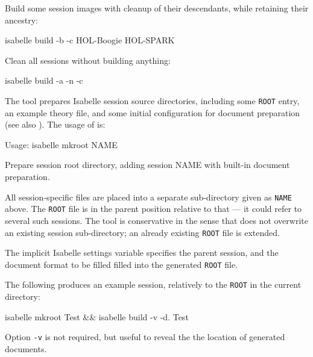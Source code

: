 \begin{isabellebody}
\begin{isamarkuptext}
  \smallskip Build some session images with cleanup of their
  descendants, while retaining their ancestry:
\begin{ttbox}
isabelle build -b -c HOL-Boogie HOL-SPARK
\end{ttbox}

  \smallskip Clean all sessions without building anything:
\begin{ttbox}
isabelle build -a -n -c
\end{ttbox}%
\end{isamarkuptext}%
\isamarkuptrue%
%
\isamarkuptrue%
%
\begin{isamarkuptext}%
The \hypertarget{tool.mkroot}{\hyperlink{tool.mkroot}{\mbox{}}} tool prepares Isabelle session source
  directories, including some \verb|ROOT| entry, an example
  theory file, and some initial configuration for document preparation
  (see also ).  The usage of \hyperlink{tool.mkroot}{\mbox{}} is:

\begin{ttbox}
Usage: isabelle mkroot NAME

  Prepare session root directory, adding session NAME with
  built-in document preparation.
\end{ttbox}

  All session-specific files are placed into a separate sub-directory
  given as \verb|NAME| above.  The \verb|ROOT| file is in
  the parent position relative to that --- it could refer to several
  such sessions.  The \hyperlink{tool.mkroot}{\mbox{}} tool is conservative in the sense
  that does not overwrite an existing session sub-directory; an
  already existing \verb|ROOT| file is extended.

  The implicit Isabelle settings variable \hyperlink{setting.ISABELLE-LOGIC}{\mbox{}}
  specifies the parent session, and \hyperlink{setting.ISABELLE-DOCUMENT-FORMAT}{\mbox{}} the document format to be filled filled
  into the generated \verb|ROOT| file.%
\end{isamarkuptext}%
\isamarkuptrue%
%
\isamarkuptrue%
%
\begin{isamarkuptext}%
The following produces an example session, relatively to the
  \verb|ROOT| in the current directory:
\begin{ttbox}
isabelle mkroot Test && isabelle build -v -d. Test
\end{ttbox}

  Option \verb|-v| is not required, but useful to reveal the
  the location of generated documents.%
\end{isamarkuptext}%
\isamarkuptrue%
%
\isadelimtheory
%
\endisadelimtheory
%
\isatagtheory
{}\isamarkupfalse%
%
\endisatagtheory
{\isafoldtheory}%
%
\isadelimtheory
%
\endisadelimtheory
\isanewline
\end{isabellebody}%
